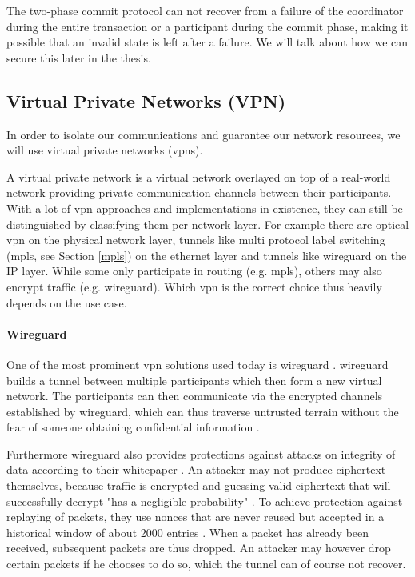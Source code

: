 The two-phase commit protocol can not recover from a failure of the coordinator during the entire transaction or a participant during the commit phase, making it possible that an invalid state is left after a failure. We will talk about how we can secure this later in the thesis.

\subsection{Virtual Private Networks (VPN)}
In order to isolate our communications and guarantee our network resources, we will use virtual private networks (\acrshort{vpn}s).

A virtual private network \cite{vpn} is a virtual network overlayed on top of a real-world network providing private communication channels between their participants. With a lot of \acrshort{vpn} approaches and implementations in existence, they can still be distinguished by classifying them per network layer. For example there are optical \acrshort{vpn} on the physical network layer, tunnels like multi protocol label switching (\acrshort{mpls}, see Section \ref{mpls}) on the ethernet layer and tunnels like \gls{wireguard} \cite{wireguard} on the IP layer. While some only participate in routing (e.g. \acrshort{mpls}), others may also encrypt traffic (e.g. \gls{wireguard}). Which \acrshort{vpn} is the correct choice thus heavily depends on the use case.

\paragraph{Wireguard} One of the most prominent \acrshort{vpn} solutions used today is \gls{wireguard} \cite{wireguard}. \Gls{wireguard} builds a tunnel between multiple participants which then form a new virtual network. The participants can then communicate via the encrypted channels established by \gls{wireguard}, which can thus traverse untrusted terrain without the fear of someone obtaining confidential information \cite{wireguard}.

Furthermore \gls{wireguard} also provides protections against attacks on integrity of data according to their whitepaper \cite{wireguard}. An attacker may not produce ciphertext themselves, because traffic is encrypted and guessing valid ciphertext that will successfully decrypt "has a negligible probability" \cite{wireguardcrypto}. To achieve protection against replaying of packets, they use nonces that are never reused but accepted in a historical window of about 2000 entries \cite{wireguardproto}. When a packet has already been received, subsequent packets are thus dropped. An attacker may however drop certain packets if he chooses to do so, which the tunnel can of course not recover.


